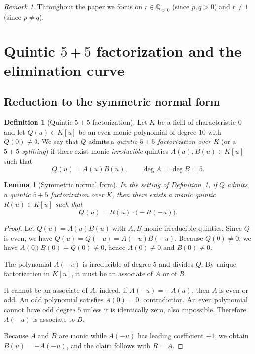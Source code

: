 \documentclass[12pt]{article}
\newtheorem{lemma}{Lemma}
\theoremstyle{remark}
\newtheorem{remark}{Remark}
\theoremstyle{definition}
\newtheorem{definition}{Definition}
\begin{document}
\begin{remark}\label{rem:domain}
Throughout the paper we focus on $r\in\mathbb{Q}_{>0}$ (since $p,q>0$) and $r\neq 1$ (since $p\neq q$).
\end{remark}


\section{Quintic \texorpdfstring{$5+5$}{5+5} factorization and the elimination curve}\label{sec:sym55}

\subsection{Reduction to the symmetric normal form}

\begin{definition}[Quintic $5+5$ factorization]\label{def:55}
Let $K$ be a field of characteristic $0$ and let $Q(u)\in K[u]$ be an even monic polynomial of degree $10$ with $Q(0)\neq 0$.
We say that $Q$ admits a \emph{quintic $5+5$ factorization over $K$} (or a \emph{$5+5$ splitting}) if there exist monic \emph{irreducible} quintics $A(u),B(u)\in K[u]$ such that
\[
Q(u)=A(u)B(u),\qquad \deg A=\deg B=5.
\]
\end{definition}

\begin{lemma}[Symmetric normal form]\label{lem:sym_normal}
In the setting of Definition~\ref{def:55}, if $Q$ admits a quintic $5+5$ factorization over $K$, then there exists a monic quintic $R(u)\in K[u]$ such that
\[
Q(u)=R(u)\cdot \bigl(-R(-u)\bigr).
\]
\end{lemma}

\begin{proof}
Let $Q(u)=A(u)B(u)$ with $A,B$ monic irreducible quintics.
Since $Q$ is even, we have $Q(u)=Q(-u)=A(-u)B(-u)$.
Because $Q(0)\neq 0$, we have $A(0)B(0)=Q(0)\neq 0$, hence $A(0)\neq 0$ and $B(0)\neq 0$.

The polynomial $A(-u)$ is irreducible of degree $5$ and divides $Q$.
By unique factorization in $K[u]$, it must be an associate of $A$ or of $B$.

It cannot be an associate of $A$: indeed, if $A(-u)=\pm A(u)$, then $A$ is even or odd.
An odd polynomial satisfies $A(0)=0$, contradiction.
An even polynomial cannot have odd degree $5$ unless it is identically zero, also impossible.
Therefore $A(-u)$ is associate to $B$.

Because $A$ and $B$ are monic while $A(-u)$ has leading coefficient $-1$, we obtain $B(u)=-A(-u)$, and the claim follows with $R=A$.
\end{proof}
\end{document}
